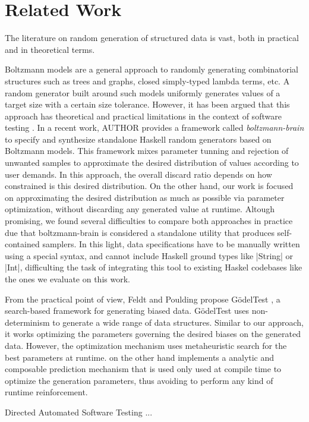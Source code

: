 \section{Related Work}

The literature on random generation of structured data is vast, both in
practical and in theoretical terms.

%
%
Boltzmann models \tocite are a general approach to randomly generating
combinatorial structures such as trees and graphs, closed simply-typed lambda
terms, etc.
%
A random generator built around such models uniformly generates values of a
target size with a certain size tolerance.
%
However, it has been argued that this approach has theoretical and practical
limitations in the context of software testing \tocite.
%
In a recent work, AUTHOR provides a framework called \emph{boltzmann-brain} to
specify and synthesize standalone Haskell random generators based on Boltzmann
models.
%
This framework mixes parameter tunning and rejection of unwanted samples to
approximate the desired distribution of values according to user demands.
%
In this approach, the overall discard ratio depends on how constrained is this
desired distribution.
%
On the other hand, our work is focused on approximating the desired distribution
as much as possible via parameter optimization, without discarding any generated
value at runtime.
%
Altough promising, we found several difficulties to compare both approaches in
practice due that boltzmann-brain is considered a standalone utility that
produces self-contained samplers.
%
In this light, data specifications have to be manually written using a special
syntax, and cannot include Haskell ground types like |String| or |Int|,
difficulting the task of integrating this tool to existing Haskel codebases like
the ones we evaluate on this work.



%
%
From the practical point of view, Feldt and Poulding propose G\"odelTest
\tocite, a search-based framework for generating biased data.
%
G\"odelTest uses non-determinism to generate a wide range of data structures.
%
Similar to our approach, it works optimizing the parameters governing the
desired biases on the generated data.
%
However, the optimization mechanism uses metaheuristic search for the best
parameters at runtime.
%
\dragenp on the other hand implements a analytic and composable prediction
mechanism that is used only used at compile time to optimize the generation
parameters, thus avoiding to perform any kind of runtime reinforcement.

%
%
Directed Automated Software Testing ...
